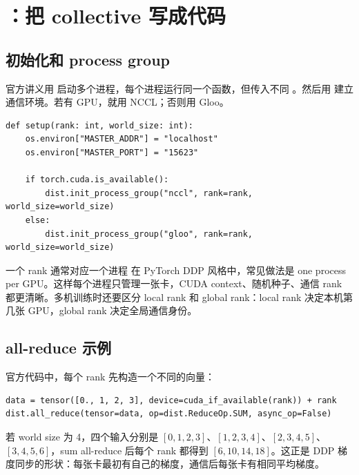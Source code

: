 \section{\texorpdfstring{}{torch.distributed}：把 collective 写成代码}

\subsection{初始化和 process group}

官方讲义用  启动多个进程，每个进程运行同一个函数，但传入不同 。然后用  建立通信环境。若有 GPU，就用 NCCL；否则用 Gloo。

\begin{lstlisting}[caption={Lecture 7 中分布式初始化的最小结构}]
def setup(rank: int, world_size: int):
    os.environ["MASTER_ADDR"] = "localhost"
    os.environ["MASTER_PORT"] = "15623"

    if torch.cuda.is_available():
        dist.init_process_group("nccl", rank=rank, world_size=world_size)
    else:
        dist.init_process_group("gloo", rank=rank, world_size=world_size)
\end{lstlisting}

\begin{knowledgebox}{一个 rank 通常对应一个进程}
在 PyTorch DDP 风格中，常见做法是 one process per GPU。这样每个进程只管理一张卡，CUDA context、随机种子、通信 rank 都更清晰。多机训练时还要区分 local rank 和 global rank：local rank 决定本机第几张 GPU，global rank 决定全局通信身份。
\end{knowledgebox}

\subsection{all-reduce 示例}

官方代码中，每个 rank 先构造一个不同的向量：

\begin{lstlisting}[caption={all-reduce 会原地修改每个 rank 的 tensor}]
data = tensor([0., 1, 2, 3], device=cuda_if_available(rank)) + rank
dist.all_reduce(tensor=data, op=dist.ReduceOp.SUM, async_op=False)
\end{lstlisting}

若 world size 为 4，四个输入分别是 \([0,1,2,3]\)、\([1,2,3,4]\)、\([2,3,4,5]\)、\([3,4,5,6]\)，sum all-reduce 后每个 rank 都得到 \([6,10,14,18]\)。这正是 DDP 梯度同步的形状：每张卡最初有自己的梯度，通信后每张卡有相同平均梯度。

